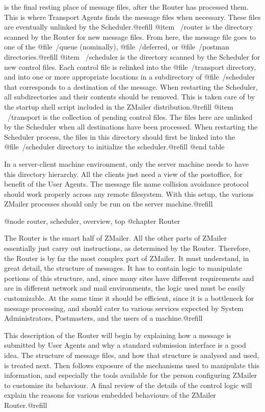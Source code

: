 is the final resting place of message files, after the Router has
processed them.  This is where Transport Agents finds the message files when
necessary.  These files are eventually unlinked by the Scheduler.@refill
@item ~/router
is the directory scanned by the Router for new message files.
From here, the message file goes to one of the @file{~/queue}
(nominally), @file{~/deferred}, or @file{~/postman} directories.@refill
@item ~/scheduler
is the directory scanned by the Scheduler for new control files.
Each control file is relinked into the @file{~/transport} directory, and into
one or more appropriate locations in a subdirectory of @file{~/scheduler} that
corresponds to a destination of the message.  When restarting the Scheduler,
all subdirectories and their contents should be removed.  This is taken care
of by the startup shell script included in the ZMailer distribution.@refill
@item ~/transport
is the collection of pending control files.  The files here are
unlinked by the Scheduler when all destinations have been processed.  When
restarting the Scheduler process, the files in this directory should first be
linked into the @file{~/scheduler} directory to initialize the scheduler.@refill
@end table

In a server-client machine environment, only the server machine needs to
have this directory hierarchy.  All the clients just need a view of the
postoffice, for benefit of the User Agents.  The message file name
collision avoidance protocol should work properly across any remote filesystem.
With this setup, the various ZMailer processes should only be run on the server
machine.@refill

@node router, scheduler, overview, top
@chapter Router

The Router is the smart half of ZMailer.  All the other parts of ZMailer
essentially just carry out instructions, as determined by the Router.
Therefore, the Router is by far the most complex part of ZMailer.  It must
understand, in great detail, the structure of messages.  It has to contain
logic to manipulate portions of this structure, and, since many sites have
different requirements and are in different network and mail environments,
the logic used must be easily customizable.  At the same time it should be
efficient, since it is a bottleneck for message processing, and should cater
to various services expected by System Administrators, Postmasters, and the
users of a machine.@refill

This description of the Router will begin by explaining how a message is
submitted by User Agents and why a standard submission interface is a good
idea.  The structure of message files, and how that structure is analysed
and used, is treated next.  Then follows exposure of the mechanisms used
to manipulate this information, and especially the tools available for the
person configuring ZMailer to customize its behaviour.  A final review of
the details of the control logic will explain the reasons for various
embedded behaviours of the ZMailer Router.@refill

